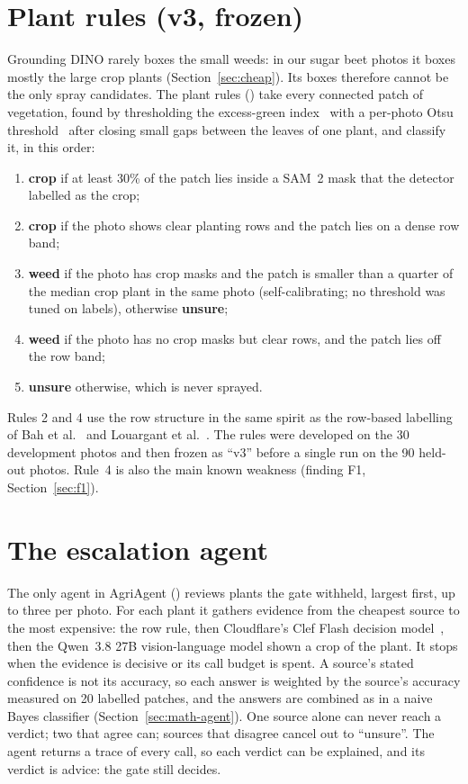 \section{Plant rules (v3, frozen)}\label{sec:rules}
Grounding DINO rarely boxes the small weeds: in our sugar beet photos it boxes mostly the large crop
plants (Section~\ref{sec:cheap}). Its boxes therefore cannot be the only spray candidates. The plant
rules () take every connected patch of vegetation, found by
thresholding the excess-green index~\cite{woebbecke1995color} with a per-photo Otsu
threshold~\cite{hamuda2016survey} after closing small gaps between the leaves of one plant, and
classify it, in this order:
\begin{enumerate}
\item \textbf{crop} if at least 30\% of the patch lies inside a SAM~2 mask that the detector labelled as the crop;
\item \textbf{crop} if the photo shows clear planting rows and the patch lies on a dense row band;
\item \textbf{weed} if the photo has crop masks and the patch is smaller than a quarter of the median
  crop plant in the same photo (self-calibrating; no threshold was tuned on labels), otherwise
  \textbf{unsure};
\item \textbf{weed} if the photo has no crop masks but clear rows, and the patch lies off the row band;
\item \textbf{unsure} otherwise, which is never sprayed.
\end{enumerate}
Rules 2 and 4 use the row structure in the same spirit as the row-based labelling of Bah et
al.~\cite{bah2018unsupervised} and Louargant et al.~\cite{louargant2018rowcrops}. The rules were developed
on the 30 development photos and then frozen as ``v3'' before a single run on the 90 held-out photos.
Rule~4 is also the main known weakness (finding F1, Section~\ref{sec:f1}).

\section{The escalation agent}\label{sec:agent}
The only agent in AgriAgent () reviews plants the gate withheld,
largest first, up to three per photo. For each plant it gathers evidence from the cheapest source to
the most expensive: the row rule, then Cloudflare's Clef Flash decision model~\cite{doc_cloudflare},
then the Qwen~3.8 27B vision-language model shown a crop of the plant. It stops when the evidence is
decisive or its call budget is spent. A source's stated confidence is not its accuracy, so each answer
is weighted by the source's accuracy measured on 20 labelled patches, and the answers are combined as
in a naive Bayes classifier (Section~\ref{sec:math-agent}). One source alone can never reach a
verdict; two that agree can; sources that disagree cancel out to ``unsure''. The agent returns a trace
of every call, so each verdict can be explained, and its verdict is advice: the gate still decides.


